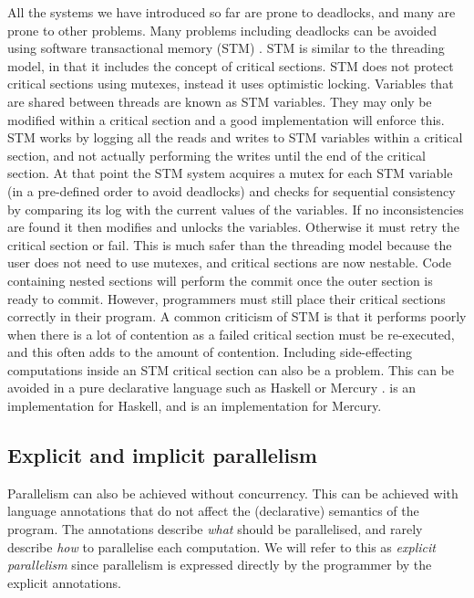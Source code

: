 All the systems we have introduced so far are prone to deadlocks,
and many are prone to other problems.
Many problems including deadlocks can be avoided using software
transactional memory (STM) \citep{stm}.
STM is similar to the threading model,
in that it includes the concept of critical sections.
STM does not protect critical sections using mutexes,
instead it uses optimistic locking.
Variables that are shared between threads are known as STM variables.
They may only be modified within a critical section and a good implementation
will enforce this.
STM works by logging all the reads and writes to STM variables within a
critical section,
and not actually performing the writes until the end of the critical
section.
At that point the STM system acquires a mutex for each STM variable
(in a pre-defined order to avoid deadlocks)
and checks for sequential consistency by comparing its log with the current
values of the variables.
If no inconsistencies are found
it then modifies and unlocks the variables.
Otherwise it must retry the critical section or fail.
This is much safer than the threading model because
the user does not need to use mutexes,
and critical sections are now nestable.
Code containing nested sections will perform the commit once 
the outer section is ready to commit.
However, programmers must still place their critical sections correctly in
their program.
A common criticism of STM is that it performs poorly when there is a lot of
contention as a failed critical section must be re-executed,
and this often adds to the amount of contention.
Including side-effecting computations inside an STM critical section can also
be a problem.
This can be avoided in a pure declarative language such as
Haskell \citep{haskell98} or Mercury \citep{mercury_jlp}.
\citet*{harris:2005:haskell-stm} is an implementation for Haskell,
and \citet*{mika:mercury-stm} is an implementation for Mercury.

\subsection{Explicit and implicit parallelism}
\label{sec:intro_par}

Parallelism can also be achieved without concurrency.
This can be achieved with language annotations that do not affect the
(declarative) semantics of the program.
The annotations describe \emph{what} should be parallelised,
and rarely describe \emph{how} to parallelise each computation.
We will refer to this as \emph{explicit parallelism}
since parallelism is expressed directly by the programmer by the explicit
annotations.

